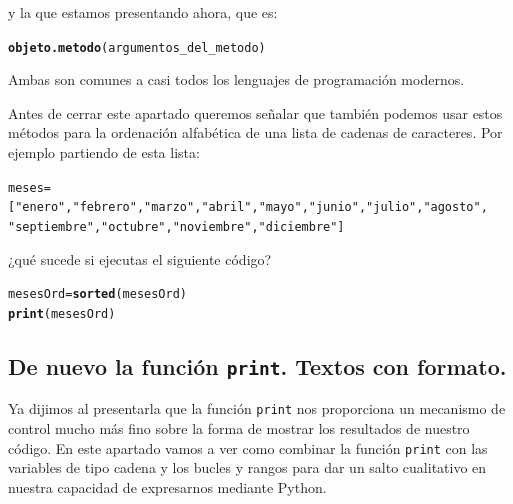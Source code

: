 \documentclass[10pt,a4paper]{article}\usepackage[]{graphicx}\usepackage[]{color}
\makeatletter
\newcommand{\hlstr}[1]{\textcolor[rgb]{0.192,0.494,0.8}{#1}}%
\newcommand{\hlstd}[1]{\textcolor[rgb]{0.345,0.345,0.345}{#1}}%
\newcommand{\hlkwb}[1]{\textcolor[rgb]{0.69,0.353,0.396}{#1}}%
\newcommand{\hlkwd}[1]{\textcolor[rgb]{0.737,0.353,0.396}{\textbf{#1}}}%
\newenvironment{kframe}{%
 \def\at@end@of@kframe{}%
 \ifinner\ifhmode%
  \def\at@end@of@kframe{\end{minipage}}%
  \begin{minipage}{\columnwidth}%
 \fi\fi%
 \def\FrameCommand##1{\hskip\@totalleftmargin \hskip-\fboxsep
 \colorbox{shadecolor}{##1}\hskip-\fboxsep
     \hskip-\linewidth \hskip-\@totalleftmargin \hskip\columnwidth}%
 \MakeFramed {\advance\hsize-\width
   \@totalleftmargin\z@ \linewidth\hsize
   \@setminipage}}%
 {\par\unskip\endMakeFramed%
 \at@end@of@kframe}
\newenvironment{knitrout}{}{} %
\newcounter {cont01}
\makeatother
\begin{document}
y la que estamos presentando ahora, que es:
\begin{knitrout}
\color{fgcolor}\begin{kframe}
\begin{alltt}
\hlkwd{objeto.metodo}\hlstd{(argumentos_del_metodo)}
\end{alltt}
\end{kframe}
\end{knitrout}
Ambas son comunes a casi todos los lenguajes de programación modernos. 

Antes de cerrar este apartado queremos señalar que también podemos usar estos métodos para la ordenación alfabética de una lista de cadenas de caracteres. Por ejemplo partiendo de esta lista:
\begin{knitrout}
\color{fgcolor}\begin{kframe}
\begin{alltt}
meses = [\hlstr{"enero"}, \hlstr{"febrero"}, \hlstr{"marzo"}, \hlstr{"abril"}, \hlstr{"mayo"}, \hlstr{"junio"}, \hlstr{"julio"}, \hlstr{"agosto"}, 
         \hlstr{"septiembre"}, \hlstr{"octubre"}, \hlstr{"noviembre"}, \hlstr{"diciembre"}]
\end{alltt}
\end{kframe}
\end{knitrout}
¿qué sucede si ejecutas el siguiente código?
\begin{knitrout}
\color{fgcolor}\begin{kframe}
\begin{alltt}
\hlstd{mesesOrd} \hlkwb{=} \hlkwd{sorted}\hlstd{(mesesOrd)}
\hlkwd{print}\hlstd{(mesesOrd)}
\end{alltt}
\end{kframe}
\end{knitrout}

\subsection{De nuevo la función {\tt print}. Textos con formato.}
\label{tut02:subsec:funcionPrintTextosFormato}

Ya dijimos al presentarla que la función {\tt print} nos proporciona un mecanismo de control mucho más fino sobre la forma de mostrar los resultados de nuestro código. En este apartado vamos a ver como combinar la función {\tt print} con las variables de tipo cadena y los bucles y rangos para dar un salto cualitativo en nuestra capacidad de expresarnos mediante Python.\\
\end{document}

